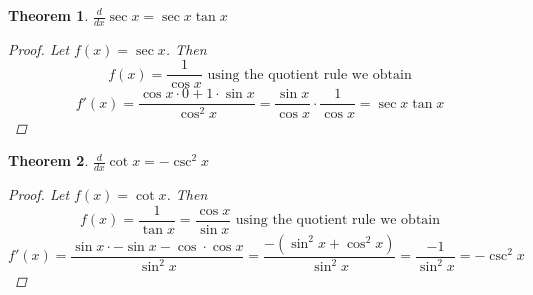 \documentclass[10pt]{report}
\newtheorem{thm3}{Theorem}[subsection]
\begin{document}
\begin{thm3}
$\frac{d}{dx}\sec x=\sec x\tan x$
\begin{proof}
Let $f(x)=\sec{x}$. Then
$$f(x)=\frac{1}{\cos{x}}\text{ using the quotient rule we obtain}$$
$$f'(x)=\frac{\cos{x}\cdot 0 + 1\cdot \sin{x}}{\cos^2x}=\frac{\sin{x}}{\cos{x}}\cdot\frac{1}{\cos{x}}=\sec{x}\tan{x}$$
\end{proof}
\end{thm3}
\begin{thm3}
$\frac{d}{dx}\cot x=-\csc^2x$
\begin{proof}
Let $f(x)=\cot{x}$. Then
$$f(x)=\frac{1}{\tan{x}}=\frac{\cos{x}}{\sin{x}}\text{ using the quotient rule we obtain}$$
$$f'(x)=\frac{\sin{x}\cdot -\sin{x} - \cos\cdot \cos{x}}{\sin^2x}=\frac{-(\sin^2{x}+\cos^2x)}{\sin^2{x}}=\frac{-1}{\sin^2x}=-\csc^2x$$
\end{proof}
\end{thm3}
\end{document}
